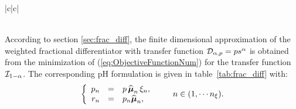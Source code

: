 \documentclass[10pt,a4paper]{article}
\begin{document}
\begin{table}[h!]
\begin{tabular}[c]{|c|c|}
    \\
    \hline
\\
    \hline
  \end{tabular}
  \caption{\label{tab:frac_int} Port-Hamiltonian formulation (\ref{eq:PHS}) for the approximation of the fractional integrator $y_\beta(s)=(p s^\beta)^{-1} u_\beta(s)$ on a finite set of $\npoles$ poles. The parameters $p_n, r_n$ for $n \in (1,\cdots \npoles)$ are defined in (\ref{eq:frac_int_parameters}) based on the minimization of (\ref{eq:ObjectiveFunctionNum}). As an example, if $u_\beta\equiv i$ and $y_\beta \equiv v$, this structure corresponds to the serial connection of $\npoles$ parallel RC cells; if $y_\beta\equiv i$ and $u_\beta \equiv v$, this structure corresponds to the parallel connection of $\npoles$ serial LC cells.}
\end{table}
%
According to section \ref{sec:frac_diff}, the finite dimensional approximation of the weighted fractional differentiator with transfer function ${\mathcal{D}}_{\alpha, p} = ps^\alpha$ is obtained from the minimization of (\ref{eq:ObjectiveFunctionNum}) for the transfer function ${\mathcal{I}}_{1-\alpha}$.
%
The corresponding pH formulation is given in table~\ref{tab:frac_diff} with:
\begin{equation}
\label{eq:frac_diff_parameters}
\left\{\begin{array}{rcl}
p_n&=&p\,\widehat{\boldsymbol{\mu}}_n\,\xi_n,\\
r_n&=&p_n\widehat{\boldsymbol{\mu}}_n,
\end{array}\right.\qquad n \in (1,\cdots {n_\xi}).
\end{equation}
%
\end{document}
